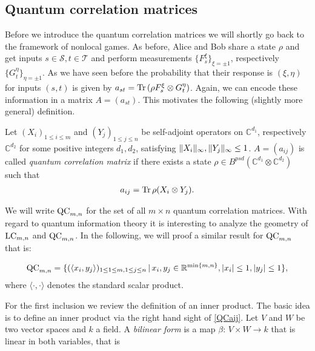 \subsection{Quantum correlation matrices}
Before we introduce the quantum correlation matrices we will shortly go back to the framework of nonlocal games. As before, Alice and Bob share a state $ \rho $ and get inputs $ s \in \mathcal{S}, t \in \mathcal{T} $ and perform measurements $ \{ F_s^{\xi} \}_{\xi = \pm 1} $, respectively $ \{ G_t^{\eta} \}_{\eta = \pm 1} $.
As we have seen before the probability that their response is $ (\xi,\eta) $ for inputs $ (s,t) $ is given by 
$ a_{st} = \text{Tr} \, {(\rho F_s^\xi \otimes G_t^\eta )}  $. Again, we can encode these information in a matrix $ A=(a_{st}) $. This motivates the following (slightly more general) definition. 
\begin{dfn}
	Let $ (X_i)_{1 \le i \le m } $ and $ (Y_j)_{1 \le j \le n} $ be self-adjoint operators on $ \mathbb{C}^{d_1} $, respectively $ \mathbb{C}^{d_2} $ for some positive integers $ d_1,d_2 $, satisfying $  \Vert {X_i} \Vert_{\infty},  \Vert {Y_j} \Vert_{\infty} \le 1 $. $ A = (a_{ij}) $ is called {\itshape quantum correlation matrix} if there exists a state $ \rho \in B^{psd}(\mathbb{C}^{d_1} \otimes \mathbb{C}^{d_2})$ such that 
	\begin{align}\label{QCaij}
	a_{ij} = \text{Tr} \, {\rho (X_i \otimes Y_j)} .
	\end{align}
\end{dfn}
\noindent We will write $ \textup{QC}_{m,n} $ for the set of all $ m \times n $ quantum correlation matrices.
With regard to quantum information theory it is interesting to analyze the geometry of $ \textup{LC}_{m,n} $ and $ \textup{QC}_{m,n} $. In the following, we will proof a similar result for $ \textup{QC}_{m,n} $ that is: 
\begin{lemma}\label{LemQC}
	\begin{align}\label{EqQC}
		\textup{QC}_{m,n} = \{ (\langle x_i,y_j \rangle)_{1 \le 1 \le m, 1 \le j \le n} \,| \, x_i,y_j \in \mathbb{R}^{ \min \{m,n \} }, \vert x_i  \vert \le 1, \vert y_j \vert \le 1  \},
	\end{align}
	where $ \langle \cdot , \cdot \rangle $ denotes the standard scalar product. 
\end{lemma}
\noindent For the first inclusion we review the definition of an inner product. The basic idea is to define an inner product via the  right hand sight of \ref{QCaij}.
Let $ V $ and $ W $ be two vector spaces and $ k  $ a field. A {\itshape bilinear form} is a map $ \beta: \, V \times W \to k $ that is linear in both variables, that is 
